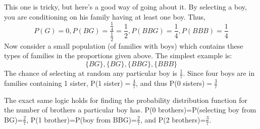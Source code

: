 \documentclass[10pt,a4paper]{article}
\begin{document}
\begin{flushleft}
This one is tricky, but here's a good way of going about it.  By selecting a boy, you are conditioning on his family having at least one boy.  Thus, 
\[P(G)=0, P(BG)=\frac{\frac{1}{4}}{\frac{1}{2}}=\frac{1}{2}, P(BBG)=\frac{1}{4}, P(BBB)=\frac{1}{4}\]
Now consider a small population (of families with boys) which contains these types of families in the proportions given above.  The simplest example is:
\[\{BG\}, \{BG\}, \{BBG\},\{BBB\}\]
The chance of selecting at random any particular boy is $\frac{1}{7}$.  Since four boys are in families containing 1 sister, P(1 sister)$=\frac{4}{7}$, and thus P(0 sisters)$=\frac{3}{7}$

The exact same logic holds for finding the probability distribution function for the number of brothers a particular boy has.  P(0 brothers)=P(selecting boy from BG)=$\frac{2}{7}$, P(1 brother)=P(boy from BBG)=$\frac{2}{7}$, and P(2 brothers)=$\frac{3}{7}$.

\end{flushleft}
\end{document}
